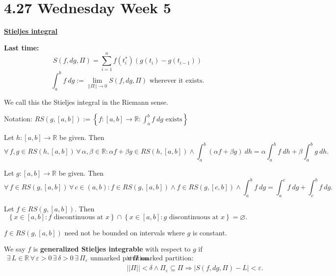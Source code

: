 \documentclass{notes}
\begin{document}
  \newpage
  
  \section{4.27 Wednesday Week 5}
  
  {\boldmath \bfseries \underline{Stieljes integral}}

  {\boldmath \bfseries Last time:} 
  \[
    S(f, dg, \Pi) = \sum_{i = 1}^n f(t^*_i) (g(t_i) - g(t_{i - 1}))
  \]
  \[
    \int_a^b f\ dg := \lim_{||\Pi|| \to 0} S(f, dg, \Pi) \text{ wherever it exists.}
  \]
  
  We call this the Stieljes integral in the Riemann sense.
  
  Notation: $RS(g, [a, b]) := \left \{ f \colon [a, b] \to \mathbb R : \int_a^b f\ dg \text{ exists} \right \}$ 
  
  \begin{lem}[Linearity]
    Let $h \colon [a, b] \to \mathbb R$ be given.
    Then 
    \[
      \forall \, f, g \in RS(h, [a, b]) \, \forall \, \alpha, \beta \in \mathbb R : \alpha f + \beta g \in RS(h, [a, b]) \land \int_a^b (\alpha f + \beta g)\ dh = \alpha \int_a^b f\ dh + \beta \int_a^b g\ dh.
    \]
  \end{lem}
  
  \begin{lem}[Additivity]
    Let $g \colon [a, b] \to \mathbb R$ be given.
    Then 
    \[
      \forall \, f \in RS(g, [a, b]) \, \forall \, c \in (a, b) : f \in RS(g, [a, b]) \land f \in RS(g, [c, b]) \land \int_a^b f\ dg = \int_a^c f\ dg + \int_c^b f\ dg.
    \]
  \end{lem}
  
  \begin{lem}
    Let $f \in RS(g, [a, b])$.
    Then 
    \[
      \left \{ x \in [a, b] : \text{$f$ discontinuous at $x$} \right \} \cap \left \{ x \in [a, b] : \text{$g$ discontinuous at $x$} \right \} = \varnothing.
    \]

    \begin{note}
      $f \in RS(g, [a, b])$ need not be bounded on intervals where $g$ is constant.
    \end{note}
  \end{lem}
  
  \begin{defn}
    We say $f$ is {\boldmath \bfseries generalized Stieljes integrable} with respect to $g$ if 
    \begin{align*}
      \exists \, L \in \mathbb R \, \forall \, \varepsilon > 0 \, \exists \, \delta > 0 \, \exists \, \Pi_\varepsilon \text{ unmarked partition} \, &\forall \, \Pi \text{ marked partition} : \\ 
      &||\Pi|| < \delta \land \Pi_\varepsilon \subseteq \Pi \Rightarrow \left | S(f, dg, \Pi) - L \right | < \varepsilon.
    \end{align*}
  \end{defn}
  
\end{document}
